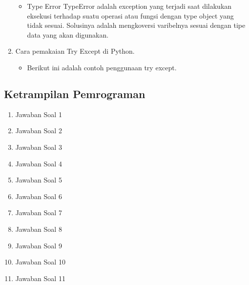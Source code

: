 \begin{enumerate}
\begin{itemize}
\item Type Error
TypeError adalah exception yang terjadi saat dilakukan eksekusi terhadap suatu operasi atau fungsi dengan type object yang tidak sesuai. Solusinya adalah mengkoversi varibelnya sesuai dengan tipe data yang akan digunakan.

\end{itemize}

\item Cara pemakaian Try Except di Python.
\begin{itemize}
\item Berikut ini adalah contoh penggunaan try except.

\end{itemize}

\end{enumerate}

\subsection{Ketrampilan Pemrograman}

\begin{enumerate}
\item Jawaban Soal 1


\item Jawaban Soal 2


\item Jawaban Soal 3


\item Jawaban Soal 4


\item Jawaban Soal 5


\item Jawaban Soal 6


\item Jawaban Soal 7


\item Jawaban Soal 8


\item Jawaban Soal 9


\item Jawaban Soal 10


\item Jawaban Soal 11


\end{enumerate}

